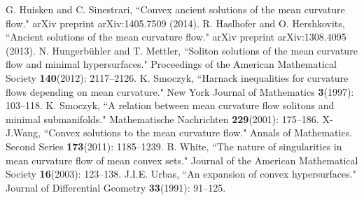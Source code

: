 \documentclass{amsart}
\theoremstyle{definition}
\theoremstyle{remark}
\numberwithin{equation}{section}
\begin{document}
\begin{thebibliography}{10}
 G. Huisken and C. Sinestrari, ``Convex ancient solutions of the mean curvature flow." arXiv preprint arXiv:1405.7509 (2014).
 R. Haslhofer and O. Hershkovits, ``Ancient solutions of the mean curvature flow." arXiv preprint arXiv:1308.4095 (2013).
 N. Hungerb{\"u}hler and T. Mettler, ``Soliton solutions of the mean curvature flow and minimal hypersurfaces." Proceedings of the American Mathematical Society \textbf{140}(2012): 2117--2126.
 K. Smoczyk, ``Harnack inequalities for curvature flows depending on mean curvature." New York Journal of Mathematics \textbf{3}(1997): 103--118.
 K. Smoczyk, ``A relation between mean curvature flow solitons and minimal submanifolds." Mathematische Nachrichten \textbf{229}(2001): 175--186.
 X-J.Wang, ``Convex solutions to the mean curvature flow." Annals of Mathematics. Second Series \textbf{173}(2011): 1185--1239.
 B. White, ``The nature of singularities in mean curvature flow of mean convex sets." Journal of the American Mathematical Society \textbf{16}(2003): 123--138.
 J.I.E. Urbas, ``An expansion of convex hypersurfaces." Journal of Differential Geometry \textbf{33}(1991): 91--125.
\end{thebibliography}
\end{document}

